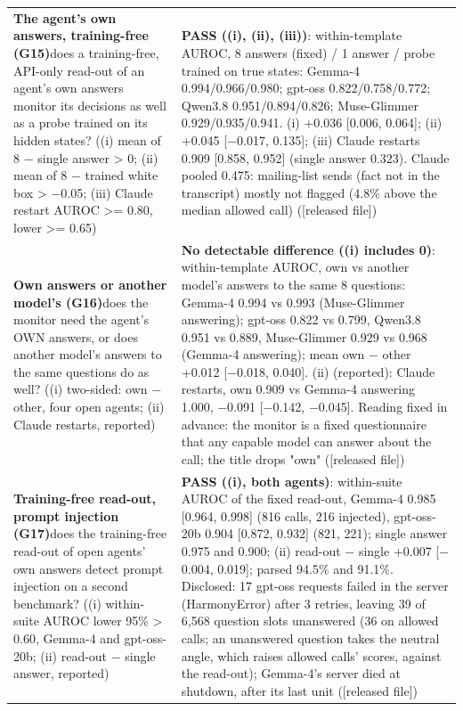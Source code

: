 {\begin{longtable}{p{}p{}}
\textbf{The agent's own answers, training-free (G15)}\newline does a training-free, API-only read-out of an agent's own answers monitor its decisions as well as a probe trained on its hidden states? ((i) mean of 8 $-$ single answer > 0; (ii) mean of 8 $-$ trained white box > $-$0.05; (iii) Claude restart AUROC >= 0.80, lower >= 0.65) & \textbf{PASS ((i), (ii), (iii))}: within-template AUROC, 8 answers (fixed) / 1 answer / probe trained on true states: Gemma-4 0.994/0.966/0.980; gpt-oss 0.822/0.758/0.772; Qwen3.8 0.951/0.894/0.826; Muse-Glimmer 0.929/0.935/0.941. (i) +0.036 [0.006, 0.064]; (ii) +0.045 [$-$0.017, 0.135]; (iii) Claude restarts 0.909 [0.858, 0.952] (single answer 0.323). Claude pooled 0.475: mailing-list sends (fact not in the transcript) mostly not flagged (4.8\% above the median allowed call) ([released file])\\[2pt]
\textbf{Own answers or another model's (G16)}\newline does the monitor need the agent's OWN answers, or does another model's answers to the same questions do as well? ((i) two-sided: own $-$ other, four open agents; (ii) Claude restarts, reported) & \textbf{No detectable difference ((i) includes 0)}: within-template AUROC, own vs another model's answers to the same 8 questions: Gemma-4 0.994 vs 0.993 (Muse-Glimmer answering); gpt-oss 0.822 vs 0.799, Qwen3.8 0.951 vs 0.889, Muse-Glimmer 0.929 vs 0.968 (Gemma-4 answering); mean own $-$ other +0.012 [$-$0.018, 0.040]. (ii) (reported): Claude restarts, own 0.909 vs Gemma-4 answering 1.000, $-$0.091 [$-$0.142, $-$0.045]. Reading fixed in advance: the monitor is a fixed questionnaire that any capable model can answer about the call; the title drops "own" ([released file])\\[2pt]
\textbf{Training-free read-out, prompt injection (G17)}\newline does the training-free read-out of open agents' own answers detect prompt injection on a second benchmark? ((i) within-suite AUROC lower 95\% > 0.60, Gemma-4 and gpt-oss-20b; (ii) read-out $-$ single answer, reported) & \textbf{PASS ((i), both agents)}: within-suite AUROC of the fixed read-out, Gemma-4 0.985 [0.964, 0.998] (816 calls, 216 injected), gpt-oss-20b 0.904 [0.872, 0.932] (821, 221); single answer 0.975 and 0.900; (ii) read-out $-$ single +0.007 [$-$0.004, 0.019]; parsed 94.5\% and 91.1\%. Disclosed: 17 gpt-oss requests failed in the server (HarmonyError) after 3 retries, leaving 39 of 6,568 question slots unanswered (36 on allowed calls; an unanswered question takes the neutral angle, which raises allowed calls' scores, against the read-out); Gemma-4's server died at shutdown, after its last unit ([released file])\\[2pt]

\end{longtable}}
